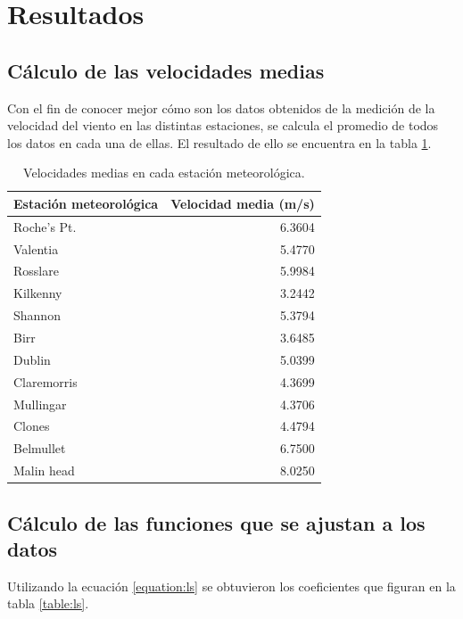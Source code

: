 \documentclass[journal, monochrome]{IEEEtran}
\begin{document}
\section{Resultados }
\label{section:results}
\vspace{0.5cm}
\subsection{Cálculo de las velocidades medias}
\par
Con el fin de conocer mejor cómo son los datos obtenidos de la medición de la velocidad del viento en las distintas estaciones, se calcula el promedio de todos los datos en cada una de ellas. El resultado de ello se encuentra en la tabla \ref{table:speed}.

\begin{table}
	\begin{center}
		\begin{tabular}{l|r}
			Estación meteorológica & Velocidad media (m/s) \\
			\hline
			Roche's Pt. & 6.3604 \\ 
			Valentia & 5.4770 \\
			Rosslare & 5.9984 \\
			Kilkenny & 3.2442 \\
			Shannon & 5.3794 \\
			Birr & 3.6485 \\
			Dublin & 5.0399 \\
			Claremorris & 4.3699 \\
			Mullingar & 4.3706 \\
			Clones & 4.4794 \\
			Belmullet & 6.7500 \\
			Malin head & 8.0250 \\
		\end{tabular}
		\caption{Velocidades medias en cada estación meteorológica.}
		\label{table:speed}
	\end{center}
\end{table}

\vspace{0.5cm}
\subsection{Cálculo de las funciones que se ajustan a los datos}
\par
Utilizando la ecuación \ref{equation:ls} se obtuvieron los coeficientes que figuran en la tabla \ref{table:ls}.
\end{document}
